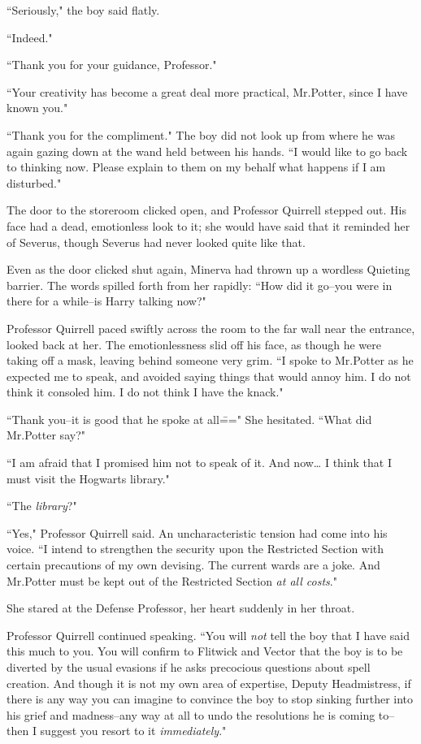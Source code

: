 ``Seriously," the boy said flatly.

``Indeed."

``Thank you for your guidance, Professor."

``Your creativity has become a great deal more practical, Mr.\?Potter, since I have known you."

``Thank you for the compliment." The boy did not look up from where he was again gazing down at the wand held between his hands. ``I would like to go back to thinking now. Please explain to them on my behalf what happens if I am disturbed."

\later

The door to the storeroom clicked open, and Professor Quirrell stepped out. His face had a dead, emotionless look to it; she would have said that it reminded her of Severus, though Severus had never looked quite like that.

Even as the door clicked shut again, Minerva had thrown up a wordless Quieting barrier. The words spilled forth from her rapidly: ``How did it go\---you were in there for a while\---is Harry talking now?"

Professor Quirrell paced swiftly across the room to the far wall near the entrance, looked back at her. The emotionlessness slid off his face, as though he were taking off a mask, leaving behind someone very grim. ``I spoke to Mr.\?Potter as he expected me to speak, and avoided saying things that would annoy him. I do not think it consoled him. I do not think I have the knack."

``Thank you\---it is good that he spoke at all\===" She hesitated. ``What did Mr.\?Potter say?"

``I am afraid that I promised him not to speak of it. And now{\ldots} I think that I must visit the Hogwarts library."

``The \emph{library}?"

``Yes," Professor Quirrell said. An uncharacteristic tension had come into his voice. ``I intend to strengthen the security upon the Restricted Section with certain precautions of my own devising. The current wards are a joke. And Mr.\?Potter must be kept out of the Restricted Section \emph{at all costs}."

She stared at the Defense Professor, her heart suddenly in her throat.

Professor Quirrell continued speaking. ``You will \emph{not} tell the boy that I have said this much to you. You will confirm to Flitwick and Vector that the boy is to be diverted by the usual evasions if he asks precocious questions about spell creation. And though it is not my own area of expertise, Deputy Headmistress, if there is any way you can imagine to convince the boy to stop sinking further into his grief and madness\---any way at all to undo the resolutions he is coming to\---then I suggest you resort to it \emph{immediately}."

